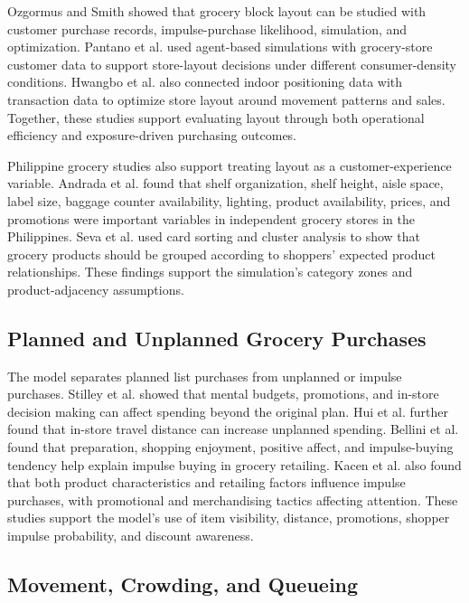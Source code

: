 \documentclass[sigconf,nonacm]{acmart}
\begin{document}
Ozgormus and Smith \citeyearpar{ozgormus2020} showed that grocery block layout can be studied with customer purchase records, impulse-purchase likelihood, simulation, and optimization. Pantano et al. \citeyearpar{pantano2021} used agent-based simulations with grocery-store customer data to support store-layout decisions under different consumer-density conditions. Hwangbo et al. \citeyearpar{hwangbo2017} also connected indoor positioning data with transaction data to optimize store layout around movement patterns and sales. Together, these studies support evaluating layout through both operational efficiency and exposure-driven purchasing outcomes.

Philippine grocery studies also support treating layout as a customer-experience variable. Andrada et al. \citeyearpar{andrada2020} found that shelf organization, shelf height, aisle space, label size, baggage counter availability, lighting, product availability, prices, and promotions were important variables in independent grocery stores in the Philippines. Seva et al. \citeyearpar{seva2019} used card sorting and cluster analysis to show that grocery products should be grouped according to shoppers' expected product relationships. These findings support the simulation's category zones and product-adjacency assumptions.

\subsection{Planned and Unplanned Grocery Purchases}

The model separates planned list purchases from unplanned or impulse purchases. Stilley et al. \citeyearpar{stilley2010} showed that mental budgets, promotions, and in-store decision making can affect spending beyond the original plan. Hui et al. \citeyearpar{hui2013} further found that in-store travel distance can increase unplanned spending. Bellini et al. \citeyearpar{bellini2017} found that preparation, shopping enjoyment, positive affect, and impulse-buying tendency help explain impulse buying in grocery retailing. Kacen et al. \citeyearpar{kacen2012} also found that both product characteristics and retailing factors influence impulse purchases, with promotional and merchandising tactics affecting attention. These studies support the model's use of item visibility, distance, promotions, shopper impulse probability, and discount awareness.

\subsection{Movement, Crowding, and Queueing}
\end{document}
